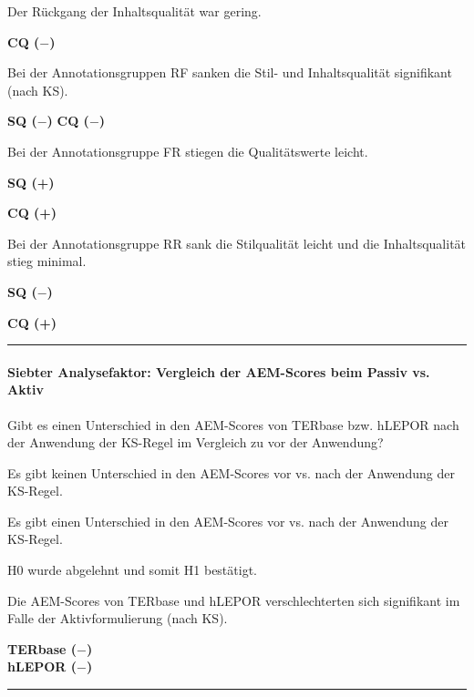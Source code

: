 \medskip
\noindent
\parbox[t]{.8\textwidth}{
Der Rückgang der Inhaltsqualität war gering.
}
\parbox[t]{.04\textwidth}{}
\parbox[t]{.15\textwidth}{
\textbf{CQ ($-$)}
}

\medskip
\noindent
\parbox[t]{.8\textwidth}{
Bei der Annotationsgruppen RF sanken die Stil- und Inhaltsqualität signifikant (nach KS).
}
\parbox[t]{.04\textwidth}{}
\colorbox{smGreen}{\parbox[t]{.15\textwidth}{
{\textbf{SQ ($-$)}}\newline
\textbf{CQ ($-$)}
}}

\medskip
\noindent
\parbox[t]{.8\textwidth}{
Bei der Annotationsgruppe FR stiegen die Qualitätswerte leicht.
}
\parbox[t]{.04\textwidth}{}
\parbox[t]{.15\textwidth}{
{ \textbf{SQ (+)}}

\textbf{CQ (+)}
}

\medskip
\noindent
\parbox[t]{.8\textwidth}{
Bei der Annotationsgruppe RR sank die Stilqualität leicht und die Inhaltsqualität stieg minimal.
}
\parbox[t]{.04\textwidth}{}
\parbox[t]{.15\textwidth}{
{ \textbf{SQ ($-$)}}

\textbf{CQ (+)}
}

\hrule
\paragraph*{Siebter Analysefaktor: Vergleich der AEM-Scores beim Passiv vs. Aktiv}
\begin{description}[font=\normalfont\bfseries]
\item [Fragestellung:] Gibt es einen Unterschied in den AEM-Scores von TERbase bzw. hLEPOR nach der Anwendung der KS-Regel im Vergleich zu vor der Anwendung?
\item [H0 --] Es gibt keinen Unterschied in den AEM-Scores vor vs. nach der Anwendung der KS-Regel.
\item [H1 --] Es gibt einen Unterschied in den AEM-Scores vor vs. nach der Anwendung der KS-Regel.
\item [Resultat]
\end{description}
\noindent
\parbox[t]{.75\textwidth}{
H0 wurde abgelehnt und somit H1 bestätigt.

Die AEM-Scores von TERbase und hLEPOR verschlechterten sich signifikant im Falle der Aktivformulierung (nach KS).
}
\parbox[t]{.04\textwidth}{}
\colorbox{smGreen}{\parbox[t]{.2\textwidth}{
 \textbf{TERbase ($-$)\\hLEPOR ($-$)}\\
}}

\hrule
